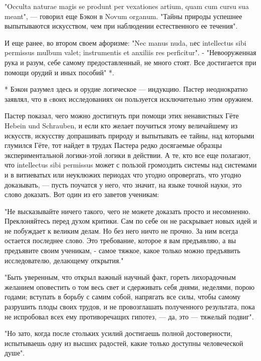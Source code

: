 "Occulta  naturae  magis  se   produnt  per  vexationes  artium,  quam
cum  cursu  sua  meant",  ---  говорил  еще  Бэкон  в  Novum  organum.
"Тайны природы  успешнее выпытываются  искусством, чем  при наблюдении
естественного ее течения".

И  еще  ранее,  во  втором   своем  афоризме:  "Nec  manus  nuda,  nес
intellectus  sibi permissus  mulbum  valet;  instrumentis et  anxiliis
res  perficitur".   -  "Невооруженная   рука  и  разум,   себе  самому
предоставленный, не много  стоят. Все достигается при  помощи орудий и
иных пособий" *.

*  Бэкон  разумел  здесь  и орудие  логическое  ---  индукцию.  Пастер
неоднократно  заявлял,   что  в  cвоих  исследованиях   он  пользуется
исключительно этим оружием.

Пастер показал, чего можно достигнуть при помощи этих ненавистных Гёте
Hebein und Schrauben, и если кто желает поучиться этому величайшему из
искусств,  искусству допрашивать  природу и  выпытывать ее  тайны, над
которыми глумился Гёте,  тот найдет в трудах  Пастера редко досягаемые
образцы  экспериментальной логики-этой  логики в  действии. А  те, кто
все  еще полагают,  что  intellectus sibi  permissus  может с  пользой
громоздить системы над системами и в витиеватых или неуклюжих периодах
что угодно  опровергать, что угодно  доказывать, --- пусть  поучатся у
него, что значит, на языке точной  науки, это слово доказать. Вот один
из его заветов ученикам:

"Не  высказывайте ничего  такого,  чего не  можете  доказать просто  и
несомненно.  Преклоняйтесь перед  духом  критики. Сам  по  себе он  не
раскрывает  новых  идей  и  не  побуждает  к  великим  делам.  Но  без
него  ничто не  прочно. За  ним всегда  остается последнее  слово. Это
требование, которое я вам предъявляю,  а вы предъявите своим ученикам,
- самое тяжкое, какое только можно предъявить исследователю, делающему
открытия."

"Быть уверенным,  что открыл важный научный  факт, гореть лихорадочным
желанием оповестить о том весь свет и сдерживать себя днями, неделями,
порою годами;  вступать в  борьбу с самим  собой, напрягать  все силы,
чтобы  самому  разрушить  плоды   своих  трудов,  и  не  провозглашать
полученного  результата, пока  не испробовал  всех ему  противоречащих
гипотез, --- да, это --- тяжелый подвиг".

"Но зато, когда после стольких усилий достигаешь полной достоверности,
испытываешь   одну  из   высших   радостей,   какие  только   доступны
человеческой душе".

